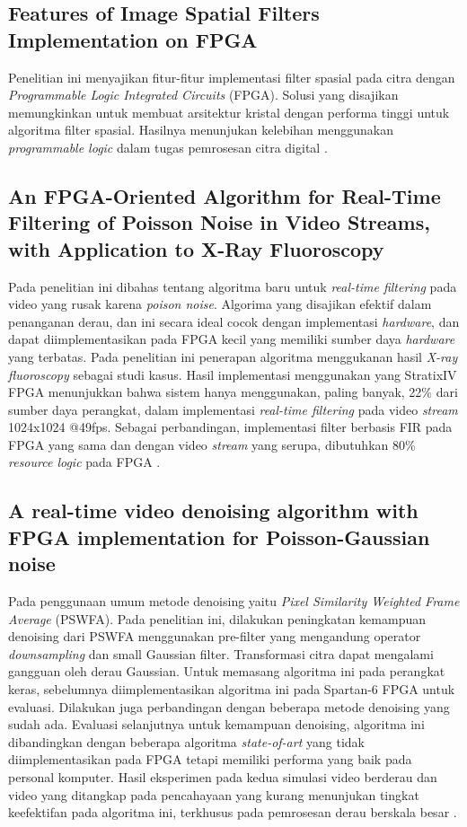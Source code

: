 \newpage

\subsection{Features of Image Spatial Filters Implementation on FPGA}
Penelitian ini menyajikan fitur-fitur implementasi filter spasial pada citra dengan \textit{Programmable Logic Integrated Circuits} (FPGA). Solusi yang disajikan memungkinkan untuk membuat arsitektur kristal dengan performa tinggi untuk algoritma filter spasial. Hasilnya menunjukan kelebihan menggunakan \textit{programmable logic} dalam tugas pemrosesan citra digital \cite{soa:dmitry}.

\subsection{An FPGA-Oriented Algorithm for Real-Time Filtering of Poisson Noise in Video Streams, with Application to X-Ray Fluoroscopy}
Pada penelitian ini dibahas tentang algoritma baru untuk \textit{real-time filtering} pada video yang rusak karena \textit{poison noise}. Algorima yang disajikan efektif dalam penanganan derau, dan ini secara ideal cocok dengan implementasi \textit{hardware}, dan dapat diimplementasikan pada FPGA kecil yang memiliki sumber daya \textit{hardware} yang terbatas. Pada penelitian ini penerapan algoritma menggukanan hasil \textit{X-ray fluoroscopy} sebagai studi kasus. Hasil implementasi menggunakan yang StratixIV FPGA menunjukkan bahwa sistem hanya menggunakan, paling banyak, 22\% dari sumber daya perangkat, dalam implementasi \textit{real-time filtering} pada video \textit{stream} 1024x1024 @49fps. Sebagai perbandingan, implementasi filter berbasis FIR pada FPGA yang sama dan dengan video \textit{stream} yang serupa, dibutuhkan 80\% \textit{resource logic} pada FPGA \cite{soa:castellano}.

\subsection{A real-time video denoising algorithm with FPGA implementation for Poisson-Gaussian noise}
Pada penggunaan umum metode denoising yaitu \textit{Pixel Similarity Weighted Frame Average} (PSWFA). Pada penelitian ini, dilakukan peningkatan kemampuan denoising dari PSWFA menggunakan pre-filter yang mengandung operator \textit{downsampling} dan small Gaussian filter. Transformasi citra dapat mengalami gangguan oleh derau Gaussian. Untuk memasang algoritma ini pada perangkat keras, sebelumnya diimplementasikan algoritma ini pada Spartan-6 FPGA untuk evaluasi. Dilakukan juga perbandingan dengan beberapa metode denoising yang sudah ada. Evaluasi selanjutnya untuk kemampuan denoising, algoritma ini dibandingkan dengan beberapa algoritma \textit{state-of-art} yang tidak diimplementasikan pada FPGA tetapi memiliki performa yang baik pada personal komputer. Hasil eksperimen pada kedua simulasi video berderau dan video yang ditangkap pada pencahayaan yang kurang menunjukan tingkat keefektifan pada algoritma ini, terkhusus pada pemrosesan derau berskala besar \cite{soa:xin}.
